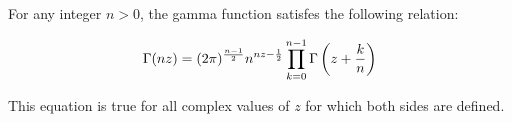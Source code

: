\documentclass[12pt]{article}
\begin{document}
For any integer $n > 0$, the gamma function satisfes the following relation:

$$\Gamma (nz) = (2 \pi)^{n - 1 \over 2} n^{nz - {1 \over 2}} \prod\limits_{k=0}^{n-1} \Gamma \left( z + {k \over n} \right)$$

This equation is true for all complex values of $z$ for which both sides are defined.
\end{document}
